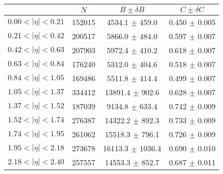\begin{tabular}{lccc}
\hline
    &   $N$   & $B \pm \delta B$  &  $C \pm \delta C$ \\
\hline
$0.00 < |\eta| <0.21$          & 152015     & 4534.1     $\pm$ 459.0 & 0.450      $\pm$ 0.005 \\
$0.21 < |\eta| <0.42$          & 200517     & 5866.0     $\pm$ 484.0 & 0.597      $\pm$ 0.007 \\
$0.42 < |\eta| <0.63$          & 207903     & 5972.4     $\pm$ 410.2 & 0.618      $\pm$ 0.007 \\
$0.63 < |\eta| <0.84$          & 176240     & 5312.0     $\pm$ 404.6 & 0.518      $\pm$ 0.007 \\
$0.84 < |\eta| <1.05$          & 169486     & 5511.8     $\pm$ 414.4 & 0.499      $\pm$ 0.007 \\
$1.05 < |\eta| <1.37$          & 334412     & 13891.4    $\pm$ 902.6 & 0.628      $\pm$ 0.007 \\
$1.37 < |\eta| <1.52$          & 187039     & 9134.8     $\pm$ 633.4 & 0.742      $\pm$ 0.009 \\
$1.52 < |\eta| <1.74$          & 276387     & 14322.2    $\pm$ 892.3 & 0.733      $\pm$ 0.009 \\
$1.74 < |\eta| <1.95$          & 261062     & 15518.3    $\pm$ 796.1 & 0.726      $\pm$ 0.009 \\
$1.95 < |\eta| <2.18$          & 273678     & 16113.3    $\pm$ 1036.4 & 0.690      $\pm$ 0.010 \\
$2.18 < |\eta| <2.40$          & 257557     & 14553.3    $\pm$ 852.7 & 0.687      $\pm$ 0.011 \\
\hline
\end{tabular}
